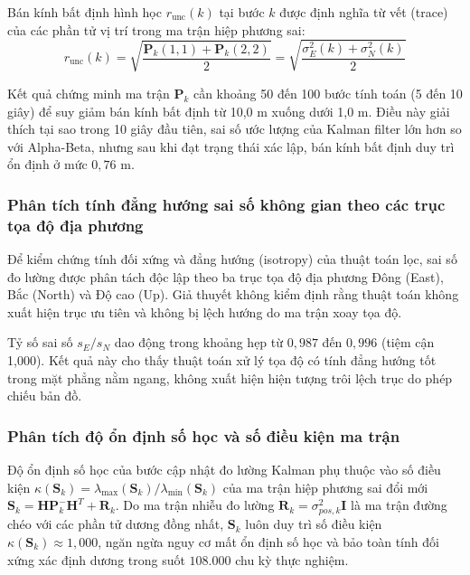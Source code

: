 Bán kính bất định hình học $r_{\text{unc}}(k)$ tại bước $k$ được định nghĩa từ vết (trace) của các phần tử vị trí trong ma trận hiệp phương sai:
\begin{equation}
r_{\text{unc}}(k) = \sqrt{\frac{\mathbf{P}_k(1,1) + \mathbf{P}_k(2,2)}{2}} = \sqrt{\frac{\sigma_E^2(k) + \sigma_N^2(k)}{2}}
\label{eq:uncertainty-radius}
\end{equation}

Kết quả chứng minh ma trận $\mathbf{P}_k$ cần khoảng 50 đến 100 bước tính toán (5 đến 10 giây) để suy giảm bán kính bất định từ 10,0 m xuống dưới 1,0 m. Điều này giải thích tại sao trong 10 giây đầu tiên, sai số ước lượng của Kalman filter lớn hơn so với Alpha-Beta, nhưng sau khi đạt trạng thái xác lập, bán kính bất định duy trì ổn định ở mức $0{,}76$ m.

\subsubsection{Phân tích tính đẳng hướng sai số không gian theo các trục tọa độ địa phương}

\hspace{0.5cm} Để kiểm chứng tính đối xứng và đẳng hướng (isotropy) của thuật toán lọc, sai số đo lường được phân tách độc lập theo ba trục tọa độ địa phương Đông (East), Bắc (North) và Độ cao (Up). Giả thuyết không kiểm định rằng thuật toán không xuất hiện trục ưu tiên và không bị lệch hướng do ma trận xoay tọa độ.

Tỷ số sai số $s_E / s_N$ dao động trong khoảng hẹp từ $0{,}987$ đến $0{,}996$ (tiệm cận 1,000). Kết quả này cho thấy thuật toán xử lý tọa độ có tính đẳng hướng tốt trong mặt phẳng nằm ngang, không xuất hiện hiện tượng trôi lệch trục do phép chiếu bản đồ.

\subsubsection{Phân tích độ ổn định số học và số điều kiện ma trận}

\hspace{0.5cm} Độ ổn định số học của bước cập nhật đo lường Kalman phụ thuộc vào số điều kiện $\kappa(\mathbf{S}_k) = \lambda_{\max}(\mathbf{S}_k) / \lambda_{\min}(\mathbf{S}_k)$ của ma trận hiệp phương sai đổi mới $\mathbf{S}_k = \mathbf{H}\mathbf{P}_k^-\mathbf{H}^T + \mathbf{R}_k$. Do ma trận nhiễu đo lường $\mathbf{R}_k = \sigma_{pos, k}^2 \mathbf{I}$ là ma trận đường chéo với các phần tử dương đồng nhất, $\mathbf{S}_k$ luôn duy trì số điều kiện $\kappa(\mathbf{S}_k) \approx 1{,}000$, ngăn ngừa nguy cơ mất ổn định số học và bảo toàn tính đối xứng xác định dương trong suốt $108.000$ chu kỳ thực nghiệm.

